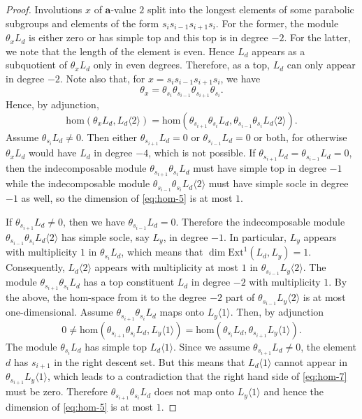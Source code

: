 \documentclass[a4paper]{amsart}
\begin{document}
\begin{proof}
Involutions $x$ of $\mathbf{a}$-value $2$ split into 
the longest elements of some parabolic subgroups
and elements of the form $s_is_{i-1}s_{i+1}s_i$.
For the former, the module $\theta_x L_d$ is either zero or
has simple top and this top is in degree $-2$.
For the latter, we note that the length of the element is
even. Hence $L_d$ appears as a subquotient of 
$\theta_x L_d$ only in even degrees. Therefore, as a top, $L_d$ can only appear
in degree $-2$. Note also that, for $x=s_is_{i-1}s_{i+1}s_i$,  we have
\begin{displaymath}
\theta_x=\theta_{s_{i}}\theta_{s_{i-1}}\theta_{s_{i+1}}\theta_{s_{i}}. 
\end{displaymath}
Hence, by adjunction, 
\begin{equation}\label{eq:hom-5}
\mathrm{hom}(\theta_x L_d,L_d\langle 2\rangle)=
\mathrm{hom}(\theta_{s_{i+1}}\theta_{s_{i}} L_d,
\theta_{s_{i-1}}\theta_{s_{i}}L_d\langle 2\rangle).
\end{equation}
Assume $\theta_{s_{i}} L_d\neq 0$.
Then either $\theta_{s_{i+1}}L_d=0$ or $\theta_{s_{i-1}}L_d=0$
or both, for otherwise $\theta_x L_d$ would have $L_d$ in degree $-4$,
which is not possible. If $\theta_{s_{i+1}}L_d=\theta_{s_{i-1}}L_d=0$, then 
the indecomposable module $\theta_{s_{i+1}}\theta_{s_{i}} L_d$ must have
simple top in degree $-1$ while 
the indecomposable module 
$\theta_{s_{i-1}}\theta_{s_{i}} L_d\langle 2\rangle$ must have
simple socle in degree $-1$ as well, so the dimension of 
\eqref{eq:hom-5} is at most $1$. 

If $\theta_{s_{i+1}}L_d\neq 0$,
then we have $\theta_{s_{i-1}}L_d=0$. Therefore the indecomposable module
$\theta_{s_{i-1}}\theta_{s_{i}}L_d\langle 2\rangle$ has simple
socle, say $L_y$, in degree $-1$. In particular, 
$L_y$ appears with multiplicity $1$ in $\theta_{s_{i}}L_d$,
which means that $\dim\mathrm{Ext}^1(L_d,L_y)=1$. Consequently,
$L_d\langle 2\rangle$ appears with multiplicity at most $1$ in 
$\theta_{s_{i-1}}L_y\langle 2\rangle$.
The module 
$\theta_{s_{i+1}}\theta_{s_{i}} L_d$ has a  top 
constituent $L_d$ in degree $-2$ with multiplicity $1$.
By the above, the hom-space from it to the degree $-2$ part of
$\theta_{s_{i-1}}L_y\langle 2\rangle$ is at most one-dimensional.
Assume $\theta_{s_{i+1}}\theta_{s_{i}} L_d$ maps onto
$L_y\langle 1\rangle$. Then, by adjunction
\begin{equation}\label{eq:hom-7}
0\neq \mathrm{hom}(\theta_{s_{i+1}}\theta_{s_{i}} L_d,L_y\langle 1\rangle)= 
\mathrm{hom}(\theta_{s_{i}} L_d,\theta_{s_{i+1}}L_y\langle 1\rangle). 
\end{equation}
The module $\theta_{s_{i}} L_d$ has simple  top $L_d\langle 1\rangle$.
Since we assume $\theta_{s_{i+1}}L_d\neq 0$, the element $d$ has
$s_{i+1}$ in the right descent set. But this means that 
$L_d\langle 1\rangle$ cannot appear in $\theta_{s_{i+1}}L_y\langle 1\rangle$,
which leads to a contradiction that the right hand side of
\eqref{eq:hom-7} must be zero. Therefore 
$\theta_{s_{i+1}}\theta_{s_{i}} L_d$ does not map onto
$L_y\langle 1\rangle$ and hence the dimension of \eqref{eq:hom-5}
is at most $1$. 


\end{proof}
\end{document}

